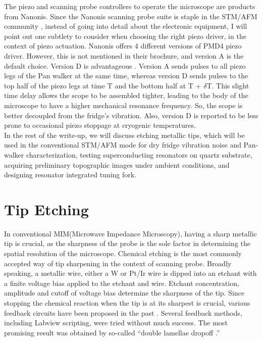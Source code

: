 \documentclass[11pt]{article}
\numberwithin{equation}{section}
\begin{document}
The piezo and scanning probe controllers to operate the microscope are products from Nanonis.  Since the Nanonis scanning probe suite is staple in the STM/AFM community , instead of going into detail about the electronic equipment, I will point out one subtlety to consider when choosing the right piezo driver, in the context of piezo actuation.  Nanonis offers 4 different versions of PMD4 piezo driver. However, this is not mentioned in their brochure, and version A is the default choice.  Version D is advantageous . Version A sends pulses to all piezo legs of the Pan walker at the same time, whereas version D sends pulses to the top half of the piezo legs at time T and the bottom half at T + $\delta$T.  This slight time delay allows the scope to be assembled tighter, leading to the body of the microscope to have a higher mechanical resonance frequency. So, the scope is better decoupled from the fridge's vibration.  Also, version D is reported to be less prone to occasional piezo stoppage at cryogenic temperatures. \\

In the rest of the write-up, we will discuss etching metallic tips, which will be used in the conventional STM/AFM mode for dry fridge vibration noise and Pan-walker characterization, testing superconducting resonators on quartz substrate, acquiring preliminary topographic images under ambient conditions, and designing resonator integrated tuning fork. \\

\section{Tip Etching}
\hspace{\parindent}
In conventional MIM(Microwave Impedance Microscopy), having a sharp metallic tip is crucial, as the sharpness of the probe is the sole factor in determining the spatial resolution of the microscope. Chemical etching is the most commonly accepted way of tip sharpening in the context of scanning probe.  Broadly speaking, a metallic wire, either a W or Pt/Ir wire is dipped into an etchant with a finite voltage bias applied to the etchant and wire.  Etchant concentration, amplitude and cutoff of voltage bias determine the sharpness of the tip. Since stopping the chemical reaction when the tip is at its sharpest is crucial, various feedback circuits have been proposed in the past \cite{tip}. Several feedback methods, including Labview scripting, were tried without much success.  The most promising result was obtained by so-called ``double lamellae dropoff \cite{doublela}.'' \linebreak
\end{document}
